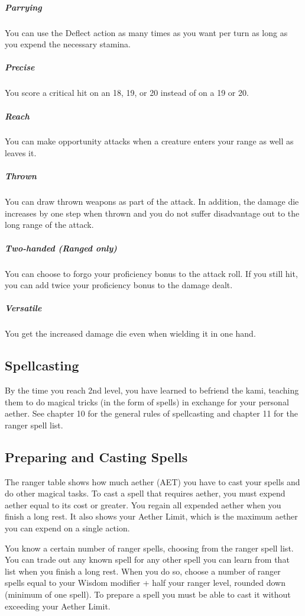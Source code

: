 \subparagraph*{Parrying} You can use the Deflect action as many times as you want per turn as long as you expend the necessary stamina.

\subparagraph*{Precise} You score a critical hit on an 18, 19, or 20 instead of on a 19 or 20.

\subparagraph*{Reach} You can make opportunity attacks when a creature enters your range as well as leaves it.

\subparagraph*{Thrown} You can draw thrown weapons as part of the attack. In addition, the damage die increases by one step when thrown and you do not suffer disadvantage out to the long range of the attack.

\subparagraph*{Two-handed (Ranged only)} You can choose to forgo your proficiency bonus to the attack roll. If you still hit, you can add twice your proficiency bonus to the damage dealt.

\subparagraph*{Versatile} You get the increased damage die even when wielding it in one hand.

\subsection{Spellcasting}

By the time you reach 2nd level, you have learned to befriend the kami, teaching them to do magical tricks (in the form of spells) in exchange for your personal aether. See chapter 10 for the general rules of spellcasting and chapter 11 for the ranger spell list.

\subsection{Preparing and Casting Spells}

The ranger table shows how much aether (AET) you have to cast your spells and do other magical tasks. To cast a spell that requires aether, you must expend aether equal to its cost or greater. You regain all expended aether when you finish a long rest. It also shows your Aether Limit, which is the maximum aether you can expend on a single action.

You know a certain number of ranger spells, choosing from the ranger spell list. You can trade out any known spell for any other spell you can learn from that list when you finish a long rest. When you do so, choose a number of ranger spells equal to your Wisdom modifier + half your ranger level, rounded down (minimum of one spell). To prepare a spell you must be able to cast it without exceeding your Aether Limit.

